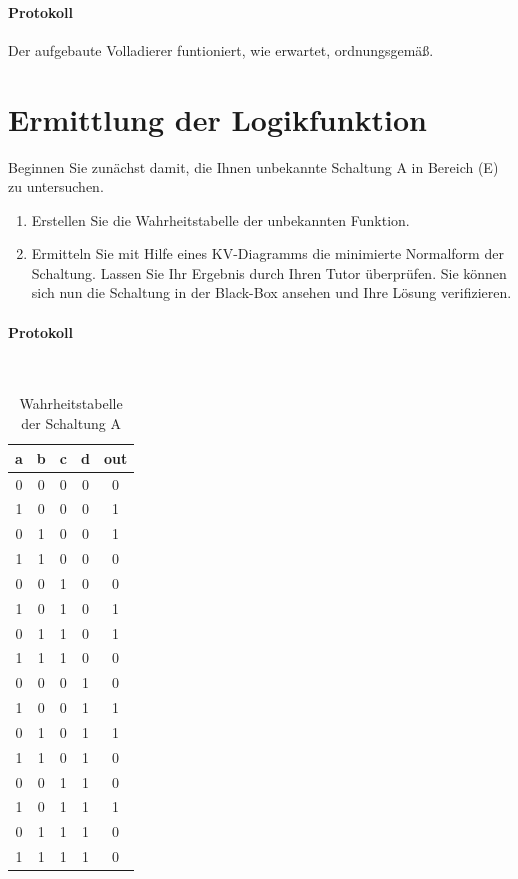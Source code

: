 \documentclass[10pt]{scrreprt}
\begin{document}
    \paragraph{Protokoll}
    Der aufgebaute Volladierer funtioniert, wie erwartet, ordnungsgemäß.

    \section{Ermittlung der Logikfunktion}
    Beginnen Sie zunächst damit, die Ihnen unbekannte Schaltung A in Bereich (E) zu
    untersuchen.
    \begin{enumerate}
        \item Erstellen Sie die Wahrheitstabelle der unbekannten Funktion.
        \item Ermitteln Sie mit Hilfe eines KV-Diagramms die minimierte Normalform der
            Schaltung. Lassen Sie Ihr Ergebnis durch Ihren Tutor überprüfen. Sie können sich nun
            die Schaltung in der Black-Box ansehen und Ihre Lösung verifizieren.
    \end{enumerate}

    \paragraph{Protokoll}
    $ $
    \begin{table}[H]
        \centering
        \begin{tabular}{cccc|c}
            \toprule
            a & b & c & d & out \\
            \midrule
            0 & 0 & 0 & 0 & 0\\
            1 & 0 & 0 & 0 & 1\\
            0 & 1 & 0 & 0 & 1\\
            1 & 1 & 0 & 0 & 0\\
            0 & 0 & 1 & 0 & 0\\
            1 & 0 & 1 & 0 & 1\\
            0 & 1 & 1 & 0 & 1\\
            1 & 1 & 1 & 0 & 0\\
            0 & 0 & 0 & 1 & 0\\
            1 & 0 & 0 & 1 & 1\\
            0 & 1 & 0 & 1 & 1\\
            1 & 1 & 0 & 1 & 0\\
            0 & 0 & 1 & 1 & 0\\
            1 & 0 & 1 & 1 & 1\\
            0 & 1 & 1 & 1 & 0\\
            1 & 1 & 1 & 1 & 0\\
            \bottomrule
        \end{tabular}
        \caption{Wahrheitstabelle der Schaltung A}
    \end{table}
\end{document}
